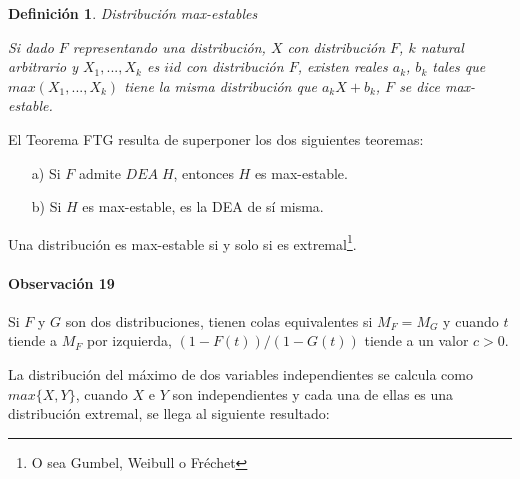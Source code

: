 \documentclass[
  12pt]{article}
\newtheorem{definition}{Definición}[section]
\begin{document}
\begin{definition} Distribución max-estables

Si dado $F$ representando una distribución, $X$ con distribución $F$, $k$ natural arbitrario y $X_1,...,X_k$ es $iid$ con distribución $F$, existen reales $a_k$, $b_k$ tales que $max(X_1,...,X_k)$ tiene la misma distribución que $a_k X+ b_k$, $F$ se dice \textit{max-estable}.
\end{definition}

El Teorema FTG resulta de superponer los dos siguientes teoremas:

\begin{theorem} 
\begin{itemize}
  \item[a)] Si $F$ admite $DEA\;H$, entonces $H$ es max-estable.
  \item[b)] Si $H$ es max-estable, es la DEA de sí misma.
\end{itemize}
\end{theorem}

\begin{theorem}
Una distribución es max-estable si y solo si es extremal\footnote{O sea Gumbel, Weibull o Fréchet}.
\end{theorem}

\paragraph*{Observación 19}

Si \(F\) y \(G\) son dos distribuciones, tienen colas equivalentes si
\(M_F=M_G\) y cuando \(t\) tiende a \(M_F\) por izquierda,
\((1-F(t))/(1-G(t))\) tiende a un valor \(c>0\).

La distribución del máximo de dos variables independientes se calcula
como \(max\{X,Y\}\), cuando \(X\) e \(Y\) son independientes y cada una
de ellas es una distribución extremal, se llega al siguiente resultado:
\end{document}

